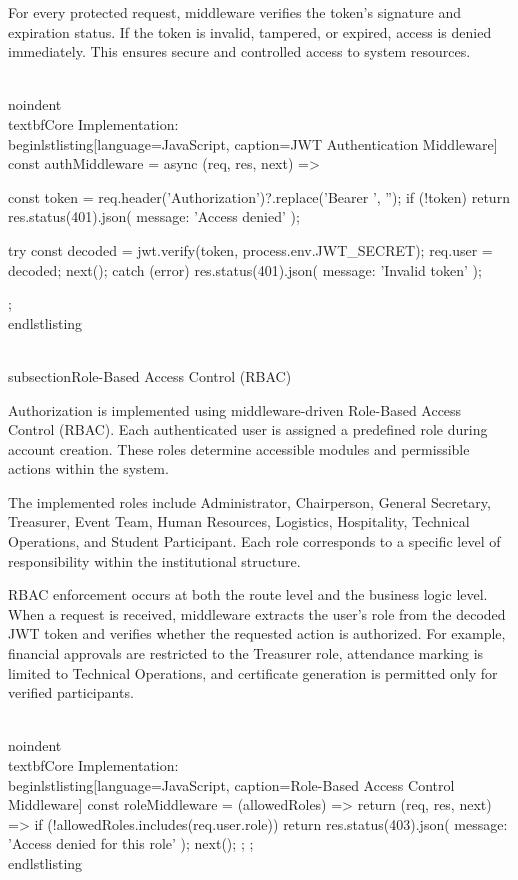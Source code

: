 For every protected request, middleware verifies the token's signature and expiration status. If the token is invalid, tampered, or expired, access is denied immediately. This ensures secure and controlled access to system resources.

\\noindent\\textbf{Core Implementation:}
\\begin{lstlisting}[language=JavaScript, caption=JWT Authentication Middleware]
const authMiddleware = async (req, res, next) => {
  const token = req.header('Authorization')?.replace('Bearer ', '');
  if (!token) {
    return res.status(401).json({ message: 'Access denied' });
  }
  
  try {
    const decoded = jwt.verify(token, process.env.JWT_SECRET);
    req.user = decoded;
    next();
  } catch (error) {
    res.status(401).json({ message: 'Invalid token' });
  }
};
\\end{lstlisting}

\\subsection{Role-Based Access Control (RBAC)}

Authorization is implemented using middleware-driven Role-Based Access Control (RBAC). Each authenticated user is assigned a predefined role during account creation. These roles determine accessible modules and permissible actions within the system.

The implemented roles include Administrator, Chairperson, General Secretary, Treasurer, Event Team, Human Resources, Logistics, Hospitality, Technical Operations, and Student Participant. Each role corresponds to a specific level of responsibility within the institutional structure.

RBAC enforcement occurs at both the route level and the business logic level. When a request is received, middleware extracts the user's role from the decoded JWT token and verifies whether the requested action is authorized. For example, financial approvals are restricted to the Treasurer role, attendance marking is limited to Technical Operations, and certificate generation is permitted only for verified participants.

\\noindent\\textbf{Core Implementation:}
\\begin{lstlisting}[language=JavaScript, caption=Role-Based Access Control Middleware]
const roleMiddleware = (allowedRoles) => {
  return (req, res, next) => {
    if (!allowedRoles.includes(req.user.role)) {
      return res.status(403).json({ 
        message: 'Access denied for this role' 
      });
    }
    next();
  };
};
\\end{lstlisting}

